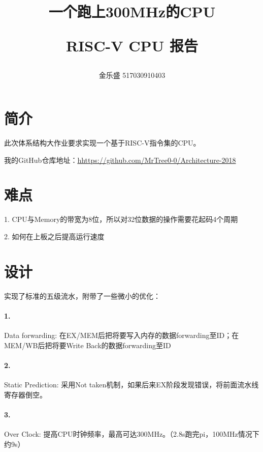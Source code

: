 \documentclass[a4paper,10pt,oneside]{article}
\begin{document}
\title{一个跑上300MHz的CPU\\[2ex]\begin{large} RISC-V CPU 报告\end{large}}
\author{金乐盛 517030910403}
\maketitle

\section{简介}
此次体系结构大作业要求实现一个基于RISC-V指令集的CPU。

我的GitHub仓库地址：\url{hhttps://github.com/MrTree0-0/Architecture-2018}

\section{难点}
1. CPU与Memory的带宽为8位，所以对32位数据的操作需要花起码4个周期

2. 如何在上板之后提高运行速度

\section{设计}
实现了标准的五级流水，附带了一些微小的优化：
\paragraph{1.} Data forwarding: 在EX/MEM后把将要写入内存的数据forwarding至ID；在MEM/WB后把将要Write Back的数据forwarding至ID

\paragraph{2.} Static Prediction: 采用Not taken机制，如果后来EX阶段发现错误，将前面流水线寄存器倒空。

\paragraph{3.} Over Clock: 提高CPU时钟频率，最高可达300MHz。（2.8s跑完pi，100MHz情况下约9s）
\end{document}
